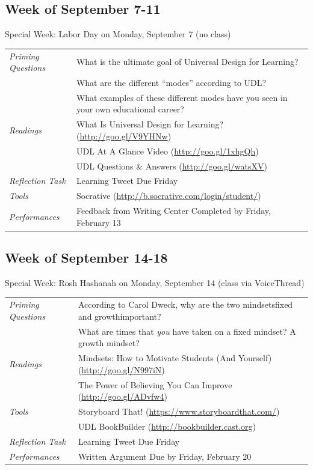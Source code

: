 \documentclass{tufte-handout}
\newcommand{\tabpq}{\faQuestionCircle\medspace\textit{Priming Questions}}
\newcommand{\tabread}{\faBook\medspace\textit{Readings}}
\newcommand{\tabperformance}{\faTasks\medspace\textit{Performances}}
\newcommand{\tabtools}{\faWrench\medspace\textit{Tools}}
\newcommand{\tabtweet}{\faLightbulbO\medspace\textit{Reflection Task} & Learning Tweet Due Friday \\}
\newenvironment{tabsched}
	{\small
	\begin{tabular}{p{1.5in}p{4.5in}}
	\toprule}
	{\bottomrule
	\end{tabular}
	\normalsize}
\newenvironment{specweek}
	{\begin{center}
		\fontseries{b} \faBullhorn \medspace Special Week: }
		{\medspace \faBullhorn \fontseries{m}
	\end{center}}
\newcommand{\weekfour}{September 7-11}
\newcommand{\weekfive}{September 14-18}
\newcommand{\laborday}{Labor Day on Monday, September 7 (no class)}
\newcommand{\roshhashanah}{Rosh Hashanah on Monday, September 14 (class via VoiceThread)}
\begin{document}
\subsection{Week of \weekfour}

\begin{specweek}\laborday\end{specweek}

\begin{tabsched}
	\tabpq & What is the ultimate goal of Universal Design for Learning? \\
	& What are the different \enquote{modes} according to UDL? \\
	& What examples of these different modes have you seen in your own educational career? \\
	\midrule
	\tabread & What Is Universal Design for Learning? (\url{http://goo.gl/V9YHNw}) \\
	& UDL At A Glance Video (\url{http://goo.gl/1xhgQh}) \\
	& UDL Questions \& Answers (\url{http://goo.gl/watsXV}) \\
	\midrule
	\tabtweet
	\midrule
	\tabtools & Socrative (\url{http://b.socrative.com/login/student/}) \\
	\midrule
	\tabperformance & Feedback from Writing Center Completed by Friday, February 13 \\
\end{tabsched}
\newpage
\subsection{Week of \weekfive}

\begin{specweek}\roshhashanah\end{specweek}

\begin{tabsched}
	\tabpq & According to Carol Dweck, why are the two mindsets\textemdash{}fixed and growth\textemdash{}important? \\
	& What are times that \emph{you} have taken on a fixed mindset? A growth mindset? \\
	\midrule
	\tabread & Mindsets: How to Motivate Students (And Yourself) (\url{http://goo.gl/N997iN}) \\
	& The Power of Believing You Can Improve (\url{http://goo.gl/ADvfw4}) \\
	\midrule
	\tabtools & Storyboard That! (\url{https://www.storyboardthat.com/}) \\
	& UDL BookBuilder (\url{http://bookbuilder.cast.org}) \\
	\midrule
	\tabtweet
	\midrule
	\tabperformance & Written Argument Due by Friday, February 20 \\
\end{tabsched}
\end{document}
